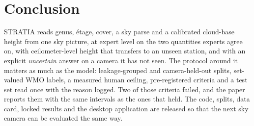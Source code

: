 \section{Conclusion}
\label{sec:conclusion}

STRATIA reads genus, \'etage, cover, a sky parse and a calibrated cloud-base height from one sky picture, at expert
level on the two quantities experts agree on, with ceilometer-level height that transfers to an unseen station,
and with an explicit \emph{uncertain} answer on a camera it has not seen. The protocol around it matters as much
as the model: leakage-grouped and camera-held-out splits, set-valued WMO labels, a measured human ceiling,
pre-registered criteria and a test set read once with the reason logged. Two of those criteria failed, and the
paper reports them with the same intervals as the ones that held. The code, splits, data card, locked results
and the desktop application are released so that the next sky camera can be evaluated the same way.
